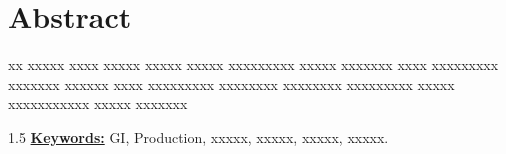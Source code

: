 \chapter*{Abstract}
\adjustmtc
\thispagestyle{MyStyle}

xx xxxxx xxxx xxxxx xxxxx xxxxx xxxxxxxxx xxxxx xxxxxxx xxxx xxxxxxxxx xxxxxxx xxxxxx xxxx xxxxxxxxx xxxxxxxx xxxxxxxx xxxxxxxxx xxxxx xxxxxxxxxxx xxxxx xxxxxxx 

\begin{spacing}{1.5}
	\underline{\textbf{Keywords:}} GI, Production, xxxxx, xxxxx, xxxxx, xxxxx.\\
\end{spacing}